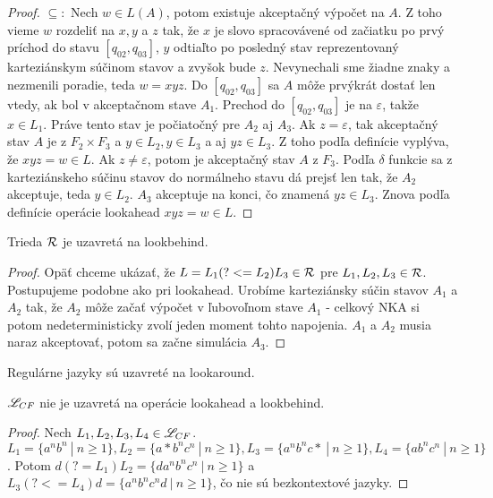 \begin{proof}
$ \subseteq: $ Nech $w \in L(A)$, potom existuje akceptačný výpočet na $A$. Z toho vieme $w$ rozdeliť na $x,y$ a $z$ tak, že $x$ je slovo spracovávené od začiatku po prvý príchod do stavu $\left[q_{02},q_{03}\right]$, $y$ odtiaľto po posledný stav reprezentovaný karteziánskym súčinom stavov a zvyšok bude $z$. Nevynechali sme žiadne znaky a nezmenili poradie, teda $w=xyz$. Do $\left[q_{02},q_{03}\right]$ sa $A$ môže prvýkrát dostať len vtedy, ak bol v akceptačnom stave $A_1$. Prechod do $\left[q_{02},q_{03}\right]$ je na $\varepsilon$, takže $x \in L_1$. Práve tento stav je počiatočný pre $A_2$ aj $A_3$. Ak $z=\varepsilon$, tak akceptačný stav $A$ je z $F_2\times F_3$ a $y \in L_2, y \in L_3$ a aj $yz \in L_3$. Z toho podľa definície vyplýva, že $xyz=w \in L$. Ak $z\neq \varepsilon$, potom je akceptačný stav $A$ z $F_3$. Podľa $\delta$ funkcie sa z karteziánskeho súčinu stavov do normálneho stavu dá prejsť len tak, že $A_2$ akceptuje, teda $y \in L_2$. $A_3$ akceptuje na konci, čo znamená $yz \in L_3$. Znova podľa definície operácie lookahead $xyz=w \in L$.
\end{proof}

\begin{lema}\label{lb+R}
Trieda ${\cal R}$ je uzavretá na lookbehind.
\end{lema}
\begin{proof}
Opäť chceme ukázať, že $ L = L_{1}(?<=L_{2})L_{3} \in {\cal R} $ pre $ L_{1}, L_{2}, L_{3} \in {\cal R} $. Postupujeme podobne ako pri lookahead. Urobíme karteziánsky súčin stavov $A_1$ a $A_2$ tak, že $A_2$ môže začať výpočet v ľubovoľnom stave $A_1$ - celkový NKA si potom nedeterministicky zvolí jeden moment tohto napojenia. $A_1$ a $A_2$ musia naraz akceptovať, potom sa začne simulácia $A_3$.
\end{proof}

\begin{veta}\label{lookahead+R}
Regulárne jazyky sú uzavreté na lookaround.
\end{veta}

\begin{veta}
$ \mathscr{L}_{CF} $ nie je uzavretá na operácie lookahead a lookbehind.
\end{veta}
\begin{proof}
Nech $ L_{1}, L_{2}, L_{3}, L_4 \in \mathscr{L}_{CF} $. $ L_1 = \lbrace a^nb^n ~|~ n\geq 1 \rbrace , L_2 = \lbrace a*b^nc^n ~|~ n\geq 1\rbrace , L_3 = \lbrace a^nb^nc* ~|~ n \geq 1\rbrace, L_4 = \lbrace ab^nc^n ~|~ n \geq 1 \rbrace$. Potom $ d(?=L_1)L_2 = \lbrace da^nb^nc^n ~|~ n\geq 1 \rbrace $ a $ L_3(?<=L_4)d = \lbrace a^nb^nc^nd ~|~ n\geq 1 \rbrace$, čo nie sú bezkontextové jazyky.
\end{proof}

